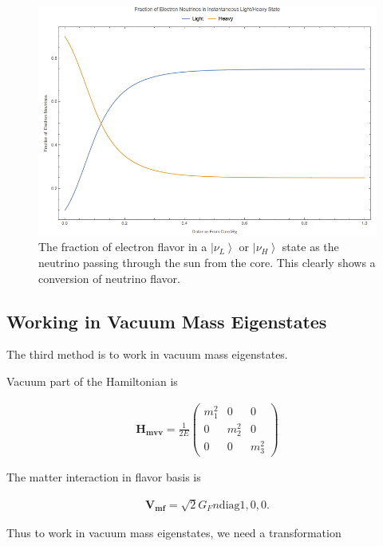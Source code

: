 \documentclass{tufte-handout}
\newcommand{\ket}[1]{\left| #1\right\rangle}
\begin{document}
\begin{figure}
\centering
\includegraphics{assets/numericalMSW-model-lh.png}
\caption{The fraction of electron flavor in a $\ket{\nu_L}$ or $\ket{\nu_H}$ state as the neutrino passing through the sun from the core. This clearly shows a conversion of neutrino flavor.}
\label{fig:numericalMSW-model-lh}
\end{figure}







\subsection{Working in Vacuum Mass Eigenstates}

The third method is to work in vacuum mass eigenstates.

Vacuum part of the Hamiltonian is

\begin{align*}
\mathbf{H_{mvv}} = \frac{1}{2E} \begin{pmatrix}
m_1^2 & 0 & 0 \\
0 & m_2^2 & 0 \\
0 & 0 & m_3^2
\end{pmatrix}
\end{align*}

The matter interaction in flavor basis is

\begin{align*}
\mathbf{V_{mf}} = \sqrt{2}G_F n \mathrm{diag}{1,0,0}.
\end{align*}

Thus to work in vacuum mass eigenstates, we need a transformation
\end{document}
